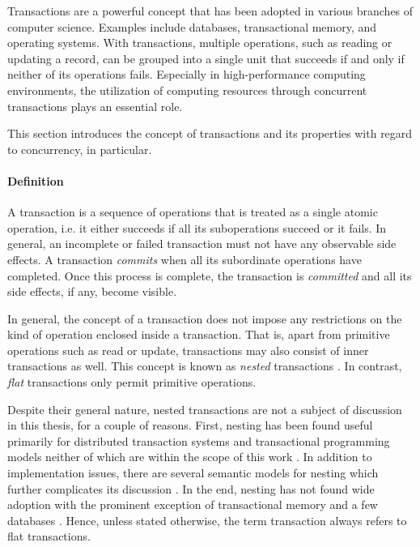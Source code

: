 Transactions are a powerful concept that has been adopted in various branches of
computer science. Examples include databases, transactional memory, and
operating systems. With transactions, multiple operations, such as reading or
updating a record, can be grouped into a single unit that succeeds if and only
if neither of its operations fails. Especially in high-performance computing
environments, the utilization of computing resources through concurrent
transactions plays an essential role.

This section introduces the concept of transactions and its properties with
regard to concurrency, in particular.

\paragraph{Definition}

A transaction is a sequence of operations that is treated as a single atomic
operation, i.e. it either succeeds if all its suboperations succeed or it fails.
In general, an incomplete or failed transaction must not have any observable
side effects. A transaction \emph{commits} when all its subordinate operations
have completed. Once this process is complete, the transaction is
\emph{committed} and all its side effects, if any, become visible.

In general, the concept of a transaction does not impose any restrictions on the
kind of operation enclosed inside a transaction. That is, apart from primitive
operations such as read or update, transactions may also consist of inner
transactions as well. This concept is known as \emph{nested} transactions
\cite{gray1981transaction}. In contrast, \emph{flat} transactions only permit
primitive operations.

Despite their general nature, nested transactions are not a subject of
discussion in this thesis, for a couple of reasons. First, nesting has been
found useful primarily for distributed transaction systems and transactional
programming models neither of which are within the scope of this work
\cite{moss1981nested, moss2006open}. In addition to implementation issues, there
are several semantic models for nesting which further complicates its discussion
\cite{harder1993concurrency, weikum1992concepts}. In the end, nesting has not
found wide adoption with the prominent exception of transactional memory
\cite{moss2006nested, moravan2006supporting, jacobi2012transactional} and a few
databases \cite{olson1999berkeley}. Hence, unless stated otherwise, the term
transaction always refers to flat transactions.

